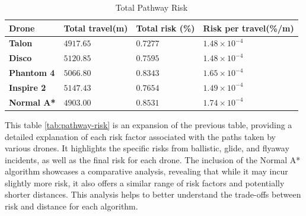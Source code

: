 \documentclass[12pt]{report}
\begin{document}
\begin{table}[H]
    \caption{Total Pathway Risk} %
    \centering
    \begin{tabular}{| l  l  l  l |}
        \hline
        \textbf{Drone} & \textbf{Total travel(m)} & \textbf{Total risk (\%)} & \textbf{Risk per travel(\%/m)} \\
        \hline
        \textbf{Talon} & \(4917.65\) & \(0.7277\) & \(1.48 \times 10^{-4}\) \\
        \hline
        \textbf{Disco} & \(5120.85\) & \(0.7595\) & \(1.48 \times 10^{-4}\) \\
        \hline
        \textbf{Phantom 4} & \(5066.80\) & \(0.8343\) & \(1.65 \times 10^{-4}\) \\
        \hline
        \textbf{Inspire 2} & \(5147.43\) & \(0.7654\) & \(1.49 \times 10^{-4}\) \\
        \hline
        \textbf{Normal A*} & \(4903.00\) & \(0.8531\) & \(1.74 \times 10^{-4}\) \\
        \hline
    \end{tabular}
    \label{tab:total-pathway-risk}
\end{table}




        This table  \ref{tab:pathway-risk} is an expansion of the previous table, providing a detailed
        explanation of each risk factor associated with the paths taken by various drones. It highlights the specific risks
        from ballistic, glide, and flyaway incidents, as well as the final risk for each drone. The inclusion of the Normal
        A* algorithm showcases a comparative analysis, revealing that while it may incur slightly more risk, it also offers
        a similar range of risk factors and potentially shorter distances. This analysis helps to better understand the
        trade-offs between risk and distance for each algorithm.
\end{document}
